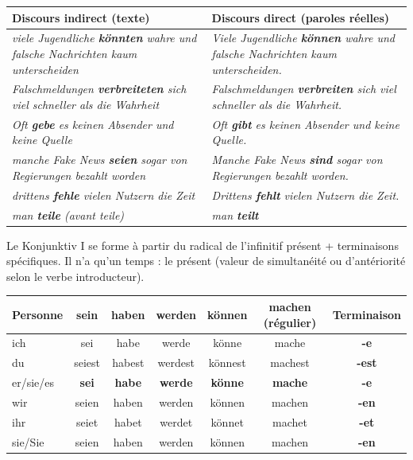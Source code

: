 \documentclass[11pt]{article}
\newcommand{\cle}[1]{{\popxbold\color{popdark}#1}}
\newcommand{\all}[1]{\ifmmode\text{\textit{#1}}\else\begingroup\selectlanguage{ngerman}\itshape #1\endgroup\fi}
\begin{document}
\begin{center}
\begin{tabularx}{\linewidth}{|X|X|}\hline
\rowcolor{popblueL} \textbf{Discours indirect (texte)} & \textbf{Discours direct (paroles réelles)} \\ \hline
\all{viele Jugendliche \textbf{könnten} wahre und falsche Nachrichten kaum unterscheiden} & \all{Viele Jugendliche \textbf{können} wahre und falsche Nachrichten kaum unterscheiden.} \\ \hline
\all{Falschmeldungen \textbf{verbreiteten} sich viel schneller als die Wahrheit} & \all{Falschmeldungen \textbf{verbreiten} sich viel schneller als die Wahrheit.} \\ \hline
\all{Oft \textbf{gebe} es keinen Absender und keine Quelle} & \all{Oft \textbf{gibt} es keinen Absender und keine Quelle.} \\ \hline
\all{manche Fake News \textbf{seien} sogar von Regierungen bezahlt worden} & \all{Manche Fake News \textbf{sind} sogar von Regierungen bezahlt worden.} \\ \hline
\all{drittens \textbf{fehle} vielen Nutzern die Zeit} & \all{Drittens \textbf{fehlt} vielen Nutzern die Zeit.} \\ \hline
\all{man \textbf{teile} (avant \all{teile})} & \all{man \textbf{teilt}} \\ \hline
\end{tabularx}
\end{center}

\begin{propriete}
Le Konjunktiv I se forme à partir du \cle{radical de l'infinitif présent} + \cle{terminaisons spécifiques}. Il n'a qu'un temps : le présent (valeur de simultanéité ou d'antériorité selon le verbe introducteur).

\begin{center}
\begin{tabular}{|l|c|c|c|c|c|c|}\hline
\rowcolor{popblueL} \textbf{Personne} & \textbf{sein} & \textbf{haben} & \textbf{werden} & \textbf{können} & \textbf{machen (régulier)} & \textbf{Terminaison} \\ \hline
ich & sei & habe & werde & könne & mache & \textbf{-e} \\ \hline
du & seiest & habest & werdest & könnest & machest & \textbf{-est} \\ \hline
er/sie/es & \textbf{sei} & \textbf{habe} & \textbf{werde} & \textbf{könne} & \textbf{mache} & \textbf{-e} \\ \hline
wir & seien & haben & werden & können & machen & \textbf{-en} \\ \hline
ihr & seiet & habet & werdet & könnet & machet & \textbf{-et} \\ \hline
sie/Sie & seien & haben & werden & können & machen & \textbf{-en} \\ \hline
\end{tabular}
\end{center}

\end{propriete}
\end{document}
